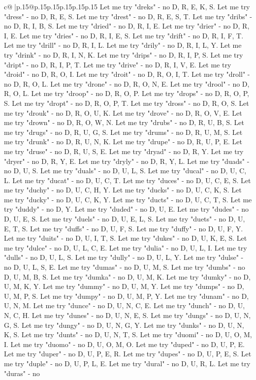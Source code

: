 \documentclass{article}
\begin{document}
{\begin{supertabular}{c@{$\;$}|p{.15\linewidth}@{}p{.15\linewidth}p{.15\linewidth}p{.15\linewidth}p{.15\linewidth}p{.15\linewidth}}
{{{Let me try "dreks" {-} no D, R, E, K, S. Let me try "dress" {-} no D, R, E, S. Let me try "drest" {-} no D, R, E, S, T. Let me try "dribs" {-} no D, R, I, B, S. Let me try "dried" {-} no D, R, I, E. Let me try "drier" {-} no D, R, I, E. Let me try "dries" {-} no D, R, I, E, S. Let me try "drift" {-} no D, R, I, F, T. Let me try "drill" {-} no D, R, I, L. Let me try "drily" {-} no D, R, I, L, Y. Let me try "drink" {-} no D, R, I, N, K. Let me try "drips" {-} no D, R, I, P, S. Let me try "dript" {-} no D, R, I, P, T. Let me try "drive" {-} no D, R, I, V, E. Let me try "droid" {-} no D, R, O, I. Let me try "droit" {-} no D, R, O, I, T. Let me try "droll" {-} no D, R, O, L. Let me try "drone" {-} no D, R, O, N, E. Let me try "drool" {-} no D, R, O, L. Let me try "droop" {-} no D, R, O, P. Let me try "drops" {-} no D, R, O, P, S. Let me try "dropt" {-} no D, R, O, P, T. Let me try "dross" {-} no D, R, O, S. Let me try "drouk" {-} no D, R, O, U, K. Let me try "drove" {-} no D, R, O, V, E. Let me try "drown" {-} no D, R, O, W, N. Let me try "drubs" {-} no D, R, U, B, S. Let me try "drugs" {-} no D, R, U, G, S. Let me try "drums" {-} no D, R, U, M, S. Let me try "drunk" {-} no D, R, U, N, K. Let me try "drupe" {-} no D, R, U, P, E. Let me try "druse" {-} no D, R, U, S, E. Let me try "dryad" {-} no D, R, Y. Let me try "dryer" {-} no D, R, Y, E. Let me try "dryly" {-} no D, R, Y, L. Let me try "duads" {-} no D, U, S. Let me try "duals" {-} no D, U, L, S. Let me try "ducal" {-} no D, U, C, L. Let me try "ducat" {-} no D, U, C, T. Let me try "duces" {-} no D, U, C, E, S. Let me try "duchy" {-} no D, U, C, H, Y. Let me try "ducks" {-} no D, U, C, K, S. Let me try "ducky" {-} no D, U, C, K, Y. Let me try "ducts" {-} no D, U, C, T, S. Let me try "duddy" {-} no D, Y. Let me try "duded" {-} no D, U, E. Let me try "dudes" {-} no D, U, E, S. Let me try "duels" {-} no D, U, E, L, S. Let me try "duets" {-} no D, U, E, T, S. Let me try "duffs" {-} no D, U, F, S. Let me try "duffy" {-} no D, U, F, Y. Let me try "duits" {-} no D, U, I, T, S. Let me try "dukes" {-} no D, U, K, E, S. Let me try "dulce" {-} no D, U, L, C, E. Let me try "dulia" {-} no D, U, L, I. Let me try "dulls" {-} no D, U, L, S. Let me try "dully" {-} no D, U, L, Y. Let me try "dulse" {-} no D, U, L, S, E. Let me try "dumas" {-} no D, U, M, S. Let me try "dumbs" {-} no D, U, M, B, S. Let me try "dumka" {-} no D, U, M, K. Let me try "dumky" {-} no D, U, M, K, Y. Let me try "dummy" {-} no D, U, M, Y. Let me try "dumps" {-} no D, U, M, P, S. Let me try "dumpy" {-} no D, U, M, P, Y. Let me try "dunam" {-} no D, U, N, M. Let me try "dunce" {-} no D, U, N, C, E. Let me try "dunch" {-} no D, U, N, C, H. Let me try "dunes" {-} no D, U, N, E, S. Let me try "dungs" {-} no D, U, N, G, S. Let me try "dungy" {-} no D, U, N, G, Y. Let me try "dunks" {-} no D, U, N, K, S. Let me try "dunts" {-} no D, U, N, T, S. Let me try "duomi" {-} no D, U, O, M, I. Let me try "duomo" {-} no D, U, O, M, O. Let me try "duped" {-} no D, U, P, E. Let me try "duper" {-} no D, U, P, E, R. Let me try "dupes" {-} no D, U, P, E, S. Let me try "duple" {-} no D, U, P, L, E. Let me try "dural" {-} no D, U, R, L. Let me try "duras" {-} no }}}
\end{supertabular}}
\end{document}

